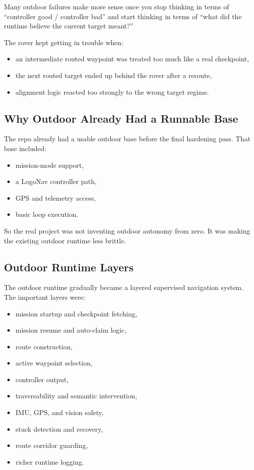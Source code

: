 \documentclass[11pt]{article}
\begin{document}
Many outdoor failures make more sense once you stop thinking in terms of
``controller good / controller bad'' and start thinking in terms of
``what did the runtime believe the current target meant?''

The rover kept getting in trouble when:

\begin{itemize}[nosep]
  \item an intermediate routed waypoint was treated too much like a real
  checkpoint,
  \item the next routed target ended up behind the rover after a reroute,
  \item alignment logic reacted too strongly to the wrong target regime.
\end{itemize}

\subsection{Why Outdoor Already Had a Runnable Base}

The repo already had a usable outdoor base before the final hardening pass. That
base included:

\begin{itemize}[nosep]
  \item mission-mode support,
  \item a LogoNav controller path,
  \item GPS and telemetry access,
  \item basic loop execution.
\end{itemize}

So the real project was not inventing outdoor autonomy from zero. It was making the
existing outdoor runtime less brittle.

\subsection{Outdoor Runtime Layers}

The outdoor runtime gradually became a layered supervised navigation system. The
important layers were:

\begin{itemize}[nosep]
  \item mission startup and checkpoint fetching,
  \item mission resume and auto-claim logic,
  \item route construction,
  \item active waypoint selection,
  \item controller output,
  \item traversability and semantic intervention,
  \item IMU, GPS, and vision safety,
  \item stuck detection and recovery,
  \item route corridor guarding,
  \item richer runtime logging.
\end{itemize}
\end{document}
